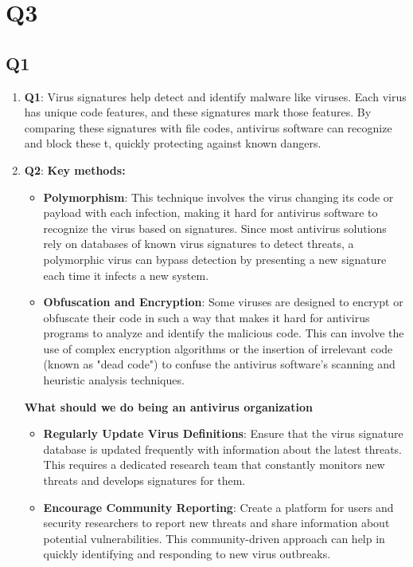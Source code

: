 \documentclass{article}
\begin{document}
\section{Q3}

\subsection{Q1}
	\begin{enumerate}
		\item \textbf{Q1}:
		Virus signatures help detect and identify malware like viruses\cite{Lenovo2023VirusSignature}. Each virus has unique code features, and these signatures mark those features. By comparing these signatures with file codes, antivirus software can recognize and block these t, quickly protecting against known dangers.

		\item \textbf{Q2}:
		\textbf{Key methods:}
			\begin{itemize}
				\item \textbf{Polymorphism}: This technique involves the virus changing its code or payload with each infection, making it hard for antivirus software to recognize the virus based on signatures. Since most antivirus solutions rely on databases of known virus signatures to detect threats, a polymorphic virus can bypass detection by presenting a new signature each time it infects a new system.

				\item \textbf{Obfuscation and Encryption}: Some viruses are designed to encrypt or obfuscate their code in such a way that makes it hard for antivirus programs to analyze and identify the malicious code. This can involve the use of complex encryption algorithms or the insertion of irrelevant code (known as "dead code") to confuse the antivirus software's scanning and heuristic analysis techniques.
			\end{itemize}

		\textbf{What should we do being an antivirus organization}
			\begin{itemize}
				\item \textbf{Regularly Update Virus Definitions}: Ensure that the virus signature database is updated frequently with information about the latest threats. This requires a dedicated research team that constantly monitors new threats and develops signatures for them.

				\item \textbf{Encourage Community Reporting}: Create a platform for users and security researchers to report new threats and share information about potential vulnerabilities. This community-driven approach can help in quickly identifying and responding to new virus outbreaks.
			\end{itemize}
	\end{enumerate}
\end{document}
